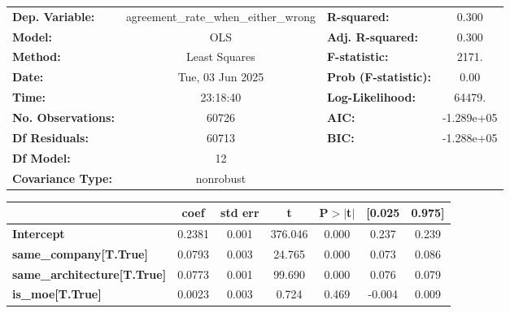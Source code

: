 \begin{center}
\begin{tabular}{lclc}
\toprule
\textbf{Dep. Variable:}             & agreement\_rate\_when\_either\_wrong & \textbf{  R-squared:         } &     0.300   \\
\textbf{Model:}                     &                 OLS                  & \textbf{  Adj. R-squared:    } &     0.300   \\
\textbf{Method:}                    &            Least Squares             & \textbf{  F-statistic:       } &     2171.   \\
\textbf{Date:}                      &           Tue, 03 Jun 2025           & \textbf{  Prob (F-statistic):} &     0.00    \\
\textbf{Time:}                      &               23:18:40               & \textbf{  Log-Likelihood:    } &    64479.   \\
\textbf{No. Observations:}          &                 60726                & \textbf{  AIC:               } & -1.289e+05  \\
\textbf{Df Residuals:}              &                 60713                & \textbf{  BIC:               } & -1.288e+05  \\
\textbf{Df Model:}                  &                    12                & \textbf{                     } &             \\
\textbf{Covariance Type:}           &              nonrobust               & \textbf{                     } &             \\
\bottomrule
\end{tabular}
\begin{tabular}{lcccccc}
                                    & \textbf{coef} & \textbf{std err} & \textbf{t} & \textbf{P$> |$t$|$} & \textbf{[0.025} & \textbf{0.975]}  \\
\midrule
\textbf{Intercept}                  &       0.2381  &        0.001     &   376.046  &         0.000        &        0.237    &        0.239     \\
\textbf{same\_company[T.True]}      &       0.0793  &        0.003     &    24.765  &         0.000        &        0.073    &        0.086     \\
\textbf{same\_architecture[T.True]} &       0.0773  &        0.001     &    99.690  &         0.000        &        0.076    &        0.079     \\
\textbf{is\_moe[T.True]}            &       0.0023  &        0.003     &     0.724  &         0.469        &       -0.004    &        0.009     \\

\end{tabular}
\end{center}
